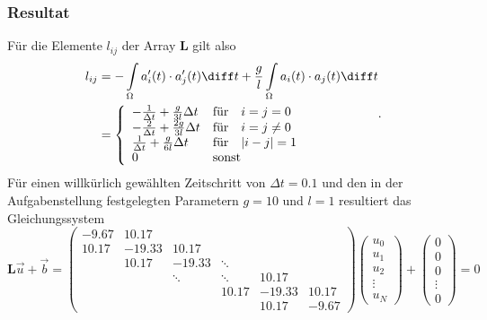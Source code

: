\subsubsection{Resultat}
Für die Elemente $l_{ij}$ der Array $\mathbf{L}$ gilt also
\begin{equation}
    \begin{aligned}
        l_{ij} 
        &= - \int\limits_\Omega a_i'(t) \cdot a_j'(t) \diff t + \frac{g}{l} \int\limits_\Omega a_i(t) \cdot a_j(t) \diff t \\
        &=  \left\{ 
                \begin{array}{ll}
                    - \frac{1}{\Delta t} + \frac{g}{3l} \Delta t & \text{für} \quad i = j = 0 \\
                    - \frac{2}{\Delta t} + \frac{2g}{3l} \Delta t & \text{für} \quad i = j \neq 0 \\
                    \frac{1}{\Delta t} + \frac{g}{6l} \Delta t & \text{für} \quad |i - j| = 1 \\
                    0 & \text{sonst}
                \end{array} 
            \right.
    \end{aligned}.
\end{equation}
Für einen willkürlich gewählten Zeitschritt von $\Delta t = 0.1$ und den in der Aufgabenstellung festgelegten Parametern $g = 10$ und $l = 1$ resultiert das Gleichungssystem
\begin{equation}
    \mathbf{L}\vec{u} + \vec{b} 
    = \begin{pmatrix}
         -9.67  & 10.17  &        &        &        &        \\
         10.17  &-19.33  & 10.17  &        &        &        \\
                & 10.17  &-19.33  & \ddots &        &        \\
                &        & \ddots & \ddots & 10.17  &        \\
                &        &        & 10.17  &-19.33  & 10.17  \\
                &        &        &        & 10.17  & -9.67
    \end{pmatrix}
    \begin{pmatrix}
        u_0 \\ u_1 \\ u_2 \\ \vdots \\ u_N
    \end{pmatrix}
    +
    \begin{pmatrix}
        0 \\ 0 \\ 0 \\ \vdots \\ 0
    \end{pmatrix}
    = 0
    \label{fem:rechenbsp:gleichungssystem}
\end{equation}


